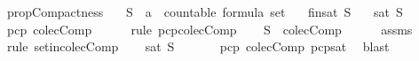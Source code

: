\begin{isabellebody}
{\isafoldproof}%
%
\isadelimproof
\isanewline
%
\endisadelimproof
\isanewline
{}\isamarkupfalse%
\ prop{\isacharunderscore}Compactness{\isacharcolon}\isanewline
\ \ \ S\ {\isacharcolon}{\isacharcolon}\ {\isachardoublequoteopen}{\isacharprime}a\ {\isacharcolon}{\isacharcolon}\ countable\ formula\ set{\isachardoublequoteclose}\isanewline
\ \ \ {\isachardoublequoteopen}fin{\isacharunderscore}sat\ S{\isachardoublequoteclose}\isanewline
\ \ \ {\isachardoublequoteopen}sat\ S{\isachardoublequoteclose}\isanewline
%
\isadelimproof
%
\endisadelimproof
%
\isatagproof
{}\isamarkupfalse%
\ {\isacharminus}\isanewline
\ \ \isamarkupfalse%
\ {\isachardoublequoteopen}pcp\ colecComp{\isachardoublequoteclose}\isanewline
\ \ \ \ \isamarkupfalse%
\ {\isacharparenleft}rule\ pcp{\isacharunderscore}colecComp{\isacharparenright}\isanewline
\ \ \isamarkupfalse%
\ {\isachardoublequoteopen}S\ {\isasymin}\ colecComp{\isachardoublequoteclose}\isanewline
\ \ \ \ \isamarkupfalse%
\ assms\ \isamarkupfalse%
\ {\isacharparenleft}rule\ set{\isacharunderscore}in{\isacharunderscore}colecComp{\isacharparenright}\isanewline
\ \ \isamarkupfalse%
\ {\isachardoublequoteopen}sat\ S{\isachardoublequoteclose}\ \isanewline
\ \ \ \ \isamarkupfalse%
\ {\isacartoucheopen}pcp\ colecComp{\isacartoucheclose}\ pcp{\isacharunderscore}sat\ \isamarkupfalse%
\ blast\ \isanewline
{}\isamarkupfalse%
\isanewline
%
\endisatagproof
{\isafoldproof}%
%
\isadelimproof
%
\endisadelimproof
%
\isadelimtheory
%
\endisadelimtheory
%
\isatagtheory
%
\endisatagtheory
{\isafoldtheory}%
%
\isadelimtheory
%
\endisadelimtheory
%
\end{isabellebody}%
\endinput
